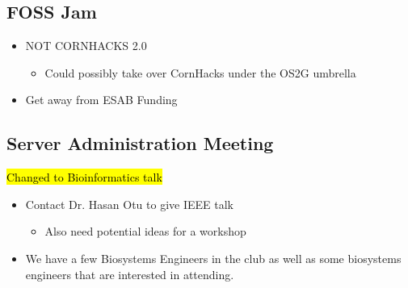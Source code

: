 \subsection{FOSS Jam}
   \begin{itemize}
       \item NOT CORNHACKS 2.0
       \begin{itemize}
            \item Could possibly take over CornHacks under the OS2G umbrella
        \end{itemize}
       \item Get away from ESAB Funding
   \end{itemize}

\subsection{Server Administration Meeting}
\hl{Changed to Bioinformatics talk}
    \begin{itemize}
         \item Contact Dr. Hasan Otu to give IEEE talk
         \begin{itemize}
             \item Also need potential ideas for a workshop
         \end{itemize}
         \item We have a few Biosystems Engineers in the club as well as some biosystems engineers that are interested in attending.
    \end{itemize}

